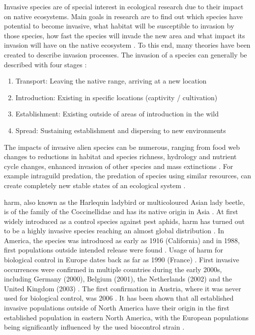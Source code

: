 \documentclass[12pt,a4paper]{article}
\begin{document}
Invasive species are of special interest in ecological research due to their impact on native ecosystems.
Main goals in research are to find out which species have potential to become invasive, what habitat will be susceptible to invasion by those species, how fast the species will invade the new area and what impact its invasion will have on the native ecosystem \autocite{shigesada1997invasions}.
To this end, many theories have been created to describe invasion processes.
The invasion of a species can  generally be described with four stages \autocite{blackburn2011invasionstages}:
\begin{enumerate}
    \item Transport: Leaving the native range, arriving at a new location
    \item Introduction: Existing in specific locations (captivity / cultivation)
    \item Establishment: Existing outside of areas of introduction in the wild
    \item Spread: Sustaining establishment and dispersing to new environments
\end{enumerate}

The impacts of invasive alien species can be numerous, ranging from food web changes to reductions in habitat and species richness, hydrology and nutrient cycle changes, enhanced invasion of other species and mass extinctions \autocite{simberloff2013invasiveimpacts}.
For example intraguild predation, the predation of species using similar resources, can create completely new stable states of an ecological system \autocite{polis1989theoryIGP}.

\gls{harm}, also known as the Harlequin ladybird or multicoloured Asian lady beetle, is of the family of the Coccinellidae and has its native origin in Asia \autocite{roy2016harmonia}.
At first widely introduced as a control species against pest aphids, \gls{harm} has turned out to be a highly invasive species reaching an almost global distribution \autocite{brown2008harmonia}.
In America, the species was introduced as early as 1916 (California) and in 1988, first populations outside intended release were found \autocite{chapin1991harmoniaNA}.
Usage of \gls{harm} for biological control in Europe dates back as far as 1990 (France) \autocite{coutanceau2006harmoniaFR}.
First invasive occurrences were confirmed in multiple countries during the early 2000s, including Germany (2000), Belgium (2001), the Netherlands (2002) and the United Kingdom (2003) \autocite{roy2016harmonia}.
The first confirmation in Austria, where it was never used for biological control, was 2006 \autocite{rabitsch2006harmoniaAT}.
It has been shown that all established invasive populations outside of North America have their origin in the first established population in eastern North America, with the European populations being significantly influenced by the used biocontrol strain \autocite{lombaert2010harmoniabridgehead}.
\end{document}
